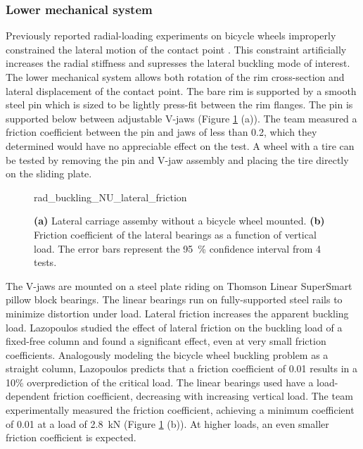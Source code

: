 \documentclass[\rootdir/thesis.tex]{subfiles}
\begin{document}
\subsubsection*{Lower mechanical system}

Previously reported radial-loading experiments on bicycle wheels improperly constrained the lateral motion of the contact point \cite{Burgoyne1993,RARblog,McLundie2007}. This constraint artificially increases the radial stiffness and supresses the lateral buckling mode of interest. The lower mechanical system allows both rotation of the rim cross-section and lateral displacement of the contact point. The bare rim is supported by a smooth steel pin which is sized to be lightly press-fit between the rim flanges. The pin is supported below between adjustable V-jaws (Figure \ref{fig:rad_buckling_NU_lateral_friction} (a)). The team measured a friction coefficient between the pin and jaws of less than 0.2, which they determined would have no appreciable effect on the test. A wheel with a tire can be tested by removing the pin and V-jaw assembly and placing the tire directly on the sliding plate.

\begin{figure}[h]
\centering
{rad_buckling_NU_lateral_friction}
\caption{\textbf{(a)} Lateral carriage assemby without a bicycle wheel mounted. \textbf{(b)} Friction coefficient of the lateral bearings as a function of vertical load. The error bars represent the \SI{95}{\percent} confidence interval from 4 tests.}
\label{fig:rad_buckling_NU_lateral_friction}
\end{figure}

The V-jaws are mounted on a steel plate riding on Thomson Linear SuperSmart pillow block bearings. The linear bearings run on fully-supported steel rails to minimize distortion under load. Lateral friction increases the apparent buckling load. Lazopoulos studied the effect of lateral friction on the buckling load of a fixed-free column \cite{Lazopoulos1991} and found a significant effect, even at very small friction coefficients. Analogously modeling the bicycle wheel buckling problem as a straight column, Lazopoulos predicts that a friction coefficient of 0.01 results in a 10\% overprediction of the critical load. The linear bearings used have a load-dependent friction coefficient, decreasing with increasing vertical load. The team experimentally measured the friction coefficient, achieving a minimum coefficient of 0.01 at a load of \SI{2.8}{\kilo\newton} (Figure \ref{fig:rad_buckling_NU_lateral_friction} (b)). At higher loads, an even smaller friction coefficient is expected.
\end{document}
